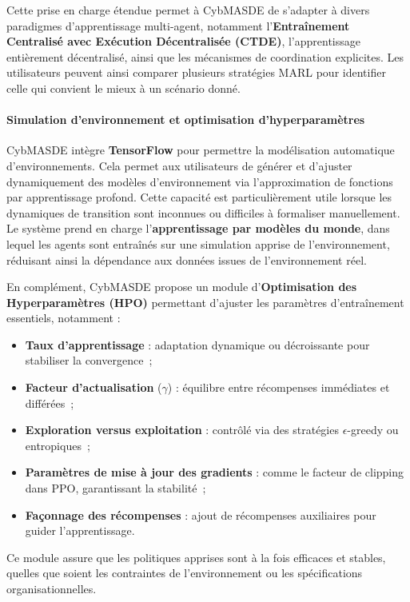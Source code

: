 Cette prise en charge étendue permet à CybMASDE de s'adapter à divers paradigmes d'apprentissage multi-agent, notamment l'\textbf{Entraînement Centralisé avec Exécution Décentralisée (CTDE)}, l'apprentissage entièrement décentralisé, ainsi que les mécanismes de coordination explicites. Les utilisateurs peuvent ainsi comparer plusieurs stratégies MARL pour identifier celle qui convient le mieux à un scénario donné.

\paragraph{Simulation d'environnement et optimisation d'hyperparamètres}

CybMASDE intègre \textbf{TensorFlow} pour permettre la modélisation automatique d'environnements. Cela permet aux utilisateurs de générer et d'ajuster dynamiquement des modèles d'environnement via l'approximation de fonctions par apprentissage profond. Cette capacité est particulièrement utile lorsque les dynamiques de transition sont inconnues ou difficiles à formaliser manuellement. Le système prend en charge l'\textbf{apprentissage par modèles du monde}, dans lequel les agents sont entraînés sur une simulation apprise de l'environnement, réduisant ainsi la dépendance aux données issues de l'environnement réel.

En complément, CybMASDE propose un module d'\textbf{Optimisation des Hyperparamètres (HPO)} permettant d'ajuster les paramètres d'entraînement essentiels, notamment :

\begin{itemize}
    \item \textbf{Taux d'apprentissage} : adaptation dynamique ou décroissante pour stabiliser la convergence~;
    \item \textbf{Facteur d'actualisation} ($\gamma$) : équilibre entre récompenses immédiates et différées~;
    \item \textbf{Exploration versus exploitation} : contrôlé via des stratégies $\epsilon$-greedy ou entropiques~;
    \item \textbf{Paramètres de mise à jour des gradients} : comme le facteur de clipping dans PPO, garantissant la stabilité~;
    \item \textbf{Façonnage des récompenses} : ajout de récompenses auxiliaires pour guider l'apprentissage.
\end{itemize}

Ce module assure que les politiques apprises sont à la fois efficaces et stables, quelles que soient les contraintes de l'environnement ou les spécifications organisationnelles.

